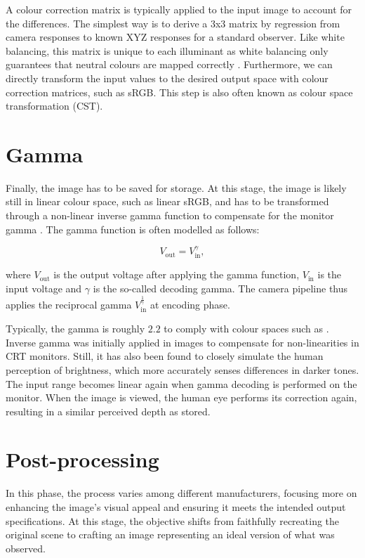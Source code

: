 A colour correction matrix is typically applied to the input image to account for the differences. The simplest way is to derive a 3x3 matrix by regression from camera responses to known XYZ responses for a standard observer. Like white balancing, this matrix is unique to each illuminant as white balancing only guarantees that neutral colours are mapped correctly \cite[1]{cheng2015beyond}. Furthermore, we can directly transform the input values to the desired output space with colour correction matrices, such as sRGB. This step is also often known as colour space transformation (CST).

\section{Gamma}


Finally, the image has to be saved for storage. At this stage, the image is likely still in linear colour space, such as linear sRGB, and has to be transformed through a non-linear inverse gamma function to compensate for the monitor gamma \cite{4050037}. The gamma function is often modelled as follows:

\begin{equation}
V_{\text{out}} = V_{\text{in}}^\gamma,
\end{equation}

where $V_{\text{out}}$ is the output voltage after applying the gamma function, $V_{\text{in}}$ is the input voltage and $\gamma$ is the so-called decoding gamma. The camera pipeline thus applies the reciprocal gamma $V_{\text{in}}^{\frac{1}{\gamma}}$ at encoding phase. 

Typically, the gamma is roughly $2.2$ to comply with colour spaces such as \cite{sRGB}. Inverse gamma was initially applied in images to compensate for non-linearities in CRT monitors. Still, it has also been found to closely simulate the human perception of brightness, which more accurately senses differences in darker tones. The input range becomes linear again when gamma decoding is performed on the monitor. When the image is viewed, the human eye performs its correction again, resulting in a similar perceived depth as stored.

\section{Post-processing}

In this phase, the process varies among different manufacturers, focusing more on enhancing the image's visual appeal and ensuring it meets the intended output specifications. At this stage, the objective shifts from faithfully recreating the original scene to crafting an image representing an ideal version of what was observed.

